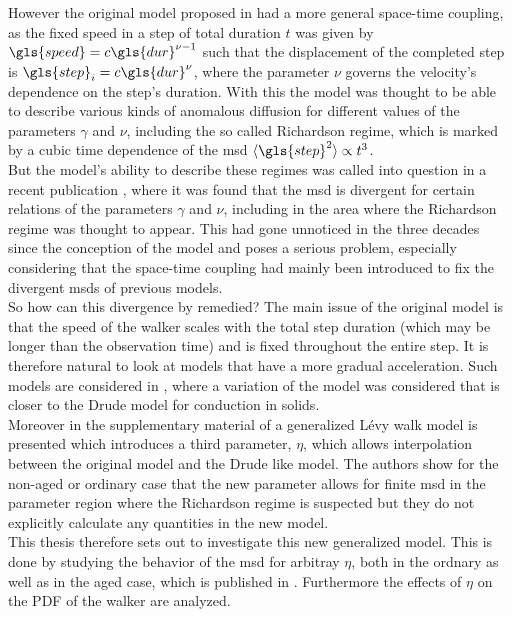 However the original model proposed in \cite{shlesinger1987} had a more general space-time coupling, as the fixed speed in a step of total duration $t$ was given by $\gls{speed} = c  \gls{dur}^{\nu-1}$ such that the displacement of the completed step is $\gls{step}_i = c \gls{dur}^{\nu}$, where the parameter $\nu$ governs the velocity's dependence on the step's duration. With this the model was thought to be able to describe various kinds of anomalous diffusion for different values of the parameters $\gamma$ and $\nu$, including the so called Richardson regime, which is marked by a cubic time dependence of the \gls{msd} $\mean{\gls{step}^2} \propto t^3$. \\

But the model's ability to describe these regimes was called into question in a recent publication \cite{radons2018}, where it was found that the \gls{msd} is divergent for certain relations of the parameters $\gamma$ and $\nu$, including in the area where the Richardson regime was thought to appear. This had gone unnoticed in the three decades since the conception of the model and poses a serious problem, especially considering that the space-time coupling had mainly been introduced to fix the divergent \gls{msd}s of previous models. \\

So how can this divergence by remedied? The main issue of the original model is that the speed of the walker scales with the total step duration (which may be longer than the observation time) and is fixed throughout the entire step. It is therefore natural to look at models that have a more gradual acceleration. Such models are considered in \cite{BarkaiKlafterBuch,schulz1997}, where a variation of the model was considered that is closer to the Drude model for conduction in solids.\\
Moreover in the supplementary material of \cite{radons2018} a generalized L\'evy walk model is presented which introduces a third parameter, $\eta$, which allows interpolation between the original model and the Drude like model. The authors show for the non-aged or ordinary case that the new parameter allows for finite \gls{msd} in the parameter region where the Richardson regime is suspected but they do not explicitly calculate any quantities in the new model.\\ 
  
This thesis therefore sets out to investigate this new generalized model. This is done by studying the behavior of the \gls{msd} for arbitray $\eta$, both in the ordnary as well as in the aged case, which is published in \cite{bothe}. Furthermore the effects of $\eta$ on the \gls{PDF} of the walker are analyzed.



